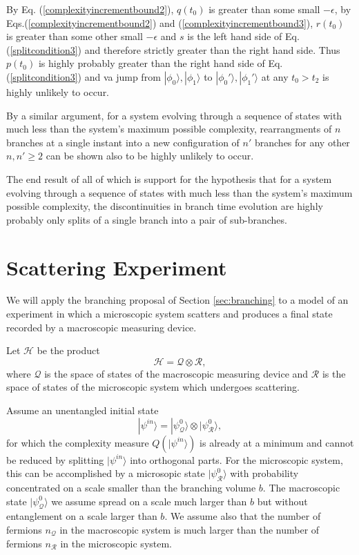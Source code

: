 \documentclass[12pt,amsmath,amssymb,onecolumn]{revtex4-2}
\begin{document}
By Eq. (\ref{complexityincrementbound2}), $q(t_0)$ is greater than some small $-\epsilon$,
by Eqs.(\ref{complexityincrementbound2}) and (\ref{complexityincrementbound3}), $r(t_0)$ is greater than
some other small $-\epsilon$ and 
$s$ is the left hand side of Eq. (\ref{splitcondition3}) and therefore strictly
greater than the right hand side. Thus $p(t_0)$ is highly probably greater
than the right hand side of Eq. (\ref{splitcondition3}) and
va jump from $|\phi_0 \rangle , |\phi_1 \rangle $ to
$|\phi_0' \rangle , |\phi_1' \rangle $ at any $t_0 > t_2$ is highly
unlikely to occur.

By a similar argument, for a system evolving through
a sequence of states with much less than the system's maximum
possible complexity,
rearrangments of $n$ branches
at a single instant into a new configuration of $n'$ branches
for any other $n, n' \ge 2$
can be shown also to be highly unlikely to occur.

The end result of all of which is
support for
the hypothesis that
for a system evolving
through a sequence of states
with much less
than the system's maximum possible complexity,
the discontinuities
in branch time evolution are
highly probably only splits of a single
branch into a pair of sub-branches.

\section{\label{sec:scattering} Scattering Experiment}

We will apply the branching proposal of Section \ref{sec:branching} to a
model of an experiment in which a microscopic system scatters and produces a final
state recorded by a macroscopic measuring device.

Let $\mathcal{H}$ be the product
\begin{equation}
\label{macromicro}
\mathcal{H} = \mathcal{Q} \otimes \mathcal{R},
\end{equation}
where $\mathcal{Q}$ is the space of states of the macroscopic measuring
device and $\mathcal{R}$ is the space of states of the microscopic
system which undergoes scattering.

Assume an unentangled initial state
\begin{equation}
\label{initialstate}
|\psi^{in} \rangle  = |\psi^0_{\mathcal{Q}} \rangle  \otimes |\psi^0_{\mathcal{R}} \rangle ,
\end{equation}
for which the complexity measure $Q( |\psi^{in} \rangle )$ is already at
a minimum and cannot be reduced by splitting $|\psi^{in} \rangle $ into
orthogonal parts. For the microscopic system, this
can be accomplished by a microsopic state $|\psi^0_{\mathcal{R}} \rangle $
with probability concentrated on a
scale smaller than the branching volume $b$. The macroscopic
state $|\psi^0_{\mathcal{Q}} \rangle $ we assume spread on a scale much
larger than $b$ but without entanglement on a scale larger than $b$.
We assume also that the number of fermions $n_{\mathcal{Q}}$ in
the macroscopic system is much larger than the number
of fermions $n_{\mathcal{R}}$ in the microscopic system.
\end{document}
